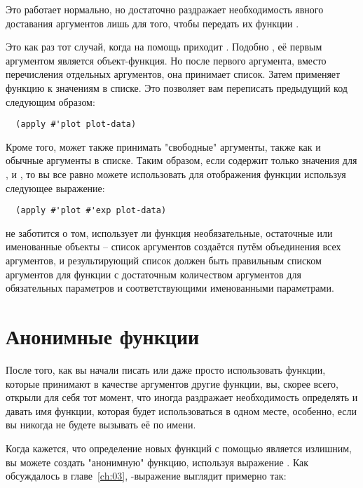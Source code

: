 Это работает нормально, но достаточно раздражает необходимость явного доставания
аргументов лишь для того, чтобы передать их функции .

Это как раз тот случай, когда на помощь приходит .  Подобно , её
первым аргументом является объект-функция.  Но после первого аргумента, вместо
перечисления отдельных аргументов, она принимает список.  Затем  применяет
функцию к значениям в списке.  Это позволяет вам переписать предыдущий код следующим
образом:

\begin{lstlisting}
  (apply #'plot plot-data)
\end{lstlisting}

Кроме того,  может также принимать "свободные" аргументы, также как и обычные
аргументы в списке. Таким образом, если  содержит только значения для
,  и , то вы все равно можете использовать  для
отображения функции  используя следующее выражение:

\begin{lstlisting}
  (apply #'plot #'exp plot-data)
\end{lstlisting}

 не заботится о том, использует ли функция необязательные, остаточные или
именованные объекты -- список аргументов создаётся путём объединения всех аргументов, и
результирующий список должен быть правильным списком аргументов для функции с достаточным
количеством аргументов для обязательных параметров и соответствующими именованными
параметрами.

\section{Анонимные функции}

После того, как вы начали писать или даже просто использовать функции, которые принимают в
качестве аргументов другие функции, вы, скорее всего, открыли для себя тот момент, что
иногда раздражает необходимость определять и давать имя функции, которая будет
использоваться в одном месте, особенно, если вы никогда не будете вызывать её по имени.

Когда кажется, что определение новых функций с помощью  является излишним, вы
можете создать "анонимную" функцию, используя выражение .  Как обсуждалось в
главе~\ref{ch:03}, -выражение выглядит примерно так:

